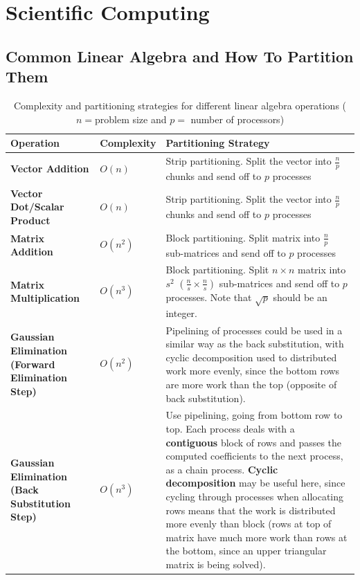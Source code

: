 \documentclass{article}
\begin{document}
\section{Scientific Computing}

\subsection{Common Linear Algebra and How To Partition Them}

\begin{table}[H]
	\centering
	\begin{tabular}{|p{5cm}|p{2cm}|p{9cm}|}
	\hline
	\textbf{Operation} & \textbf{Complexity} & \textbf{Partitioning Strategy} \\
	\hline
	\textbf{Vector Addition} & $O(n)$ & Strip partitioning. Split the vector into $\frac{n}{p}$ chunks and send off to $p$ processes\\	
	\textbf{Vector Dot/Scalar Product} & $O(n)$ & Strip partitioning. Split the vector into $\frac{n}{p}$ chunks and send off to $p$ processes\\	
	\textbf{Matrix Addition} & $O(n^2)$ & Block partitioning. Split matrix into $\frac{n}{p}$ sub-matrices and send off to $p$ processes \\
	\textbf{Matrix Multiplication} & $O(n^3)$ & Block partitioning. Split $n \times n$ matrix into $s^2$ $(\frac{n}{s} \times \frac{n}{s})$ sub-matrices and send off to $p$ processes. Note that $\sqrt{p}$ should be an integer. \\
	\textbf{Gaussian Elimination (Forward Elimination Step)} & $O(n^2)$ &  Pipelining of processes could be used in a similar way as the back substitution, with cyclic decomposition used to distributed work more evenly, since the bottom rows are more work than the top (opposite of back substitution). \\
	\textbf{Gaussian Elimination (Back Substitution Step)} & $O(n^3)$ &  Use pipelining, going from bottom row to top. Each process deals with a \textbf{contiguous} block of rows and passes the computed coefficients to the next process, as a chain process. \textbf{Cyclic decomposition} may be useful here, since cycling through processes when allocating rows means that the work is distributed more evenly than block (rows at top of matrix have much more work than rows at the bottom, since an upper triangular matrix is being solved). \\
	\hline
	\end{tabular}
	\caption{Complexity and partitioning strategies for different linear algebra operations ($n= $problem size and $p= $ number of processors)}
\end{table}
\end{document}

